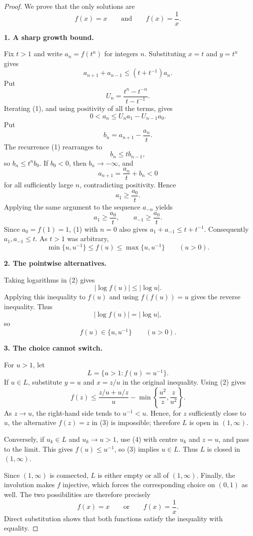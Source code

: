 
\begin{dlsummary}[title={\bfseries Solution 36. The Multiplicative Mirror: Positive Recurrence},breakable]

\begin{proof}
We prove that the only solutions are
\[
f(x)=x\qquad\text{and}\qquad f(x)=\frac1x.
\]

\medskip
\noindent\textbf{1. A sharp growth bound.}

Fix $t>1$ and write $a_n=f(t^n)$ for integers $n$. Substituting
$x=t$ and $y=t^n$ gives
\[
a_{n+1}+a_{n-1}\le (t+t^{-1})a_n. \tag{1}
\]
Put
\[
U_n=\frac{t^n-t^{-n}}{t-t^{-1}}.
\]
Iterating (1), and using positivity of all the terms, gives
\[
0<a_n\le U_n a_1-U_{n-1}a_0.
\]
Put
\[
b_n=a_{n+1}-\frac{a_n}{t}.
\]
The recurrence (1) rearranges to
\[
b_n\le t b_{n-1},
\]
so $b_n\le t^n b_0$. If $b_0<0$, then $b_n\to-\infty$, and
\[
a_{n+1}=\frac{a_n}{t}+b_n<0
\]
for all sufficiently large $n$, contradicting positivity. Hence
\[
a_1\ge\frac{a_0}{t}.
\]
Applying the same argument to the sequence $a_{-n}$ yields
\[
a_1\ge \frac{a_0}{t},\qquad a_{-1}\ge \frac{a_0}{t}.
\]
Since $a_0=f(1)=1$, (1) with $n=0$ also gives
$a_1+a_{-1}\le t+t^{-1}$. Consequently $a_1,a_{-1}\le t$. As $t>1$ was arbitrary,
\[
\min\{u,u^{-1}\}\le f(u)\le\max\{u,u^{-1}\}
\qquad(u>0). \tag{2}
\]

\medskip
\noindent\textbf{2. The pointwise alternatives.}

Taking logarithms in (2) gives
\[
|\log f(u)|\le |\log u|.
\]
Applying this inequality to $f(u)$ and using $f(f(u))=u$ gives the reverse
inequality. Thus
\[
|\log f(u)|=|\log u|,
\]
so
\[
f(u)\in\{u,u^{-1}\}\qquad(u>0). \tag{3}
\]

\medskip
\noindent\textbf{3. The choice cannot switch.}

For $u>1$, let
\[
L=\{u>1:f(u)=u^{-1}\}.
\]
If $u\in L$, substitute $y=u$ and $x=z/u$ in the original inequality. Using
(2) gives
\[
f(z)\le
\frac{z/u+u/z}{u}
-\min\left\{\frac{u^2}{z},\frac{z}{u^2}\right\}. \tag{4}
\]
As $z\to u$, the right-hand side tends to $u^{-1}<u$. Hence, for $z$
sufficiently close to $u$, the alternative $f(z)=z$ in (3) is impossible;
therefore $L$ is open in $(1,\infty)$.

Conversely, if $u_k\in L$ and $u_k\to u>1$, use (4) with centre $u_k$
and $z=u$, and pass to the limit. This gives $f(u)\le u^{-1}$, so (3)
implies $u\in L$. Thus $L$ is closed in $(1,\infty)$.

Since $(1,\infty)$ is connected, $L$ is either empty or all of $(1,\infty)$.
Finally, the involution makes $f$ injective, which forces the corresponding
choice on $(0,1)$ as well. The two possibilities are therefore precisely
\[
f(x)=x\qquad\text{or}\qquad f(x)=\frac1x.
\]
Direct substitution shows that both functions satisfy the inequality with
equality.
\end{proof}
\end{dlsummary}

